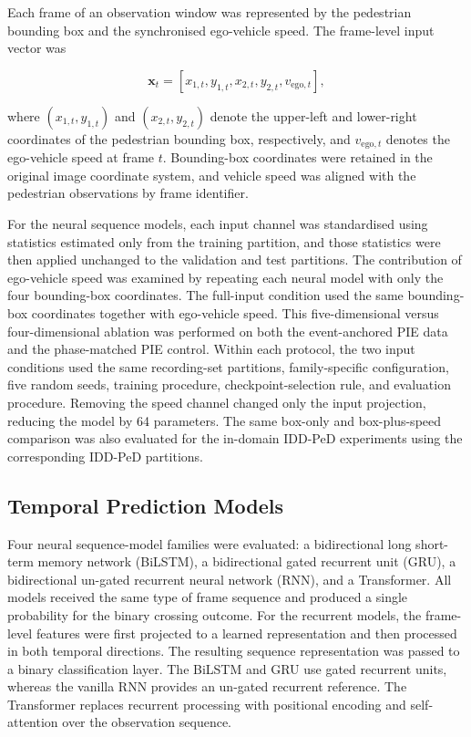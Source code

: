 \documentclass[mti,article,submit,moreauthors]{Definitions/mdpi}
\begin{document}
Each frame of an observation window was represented by the pedestrian bounding box and
the synchronised ego-vehicle speed. The frame-level input vector was

\begin{equation}
    \mathbf{x}_{t}
    =
    \left[
    x_{1,t},
    y_{1,t},
    x_{2,t},
    y_{2,t},
    v_{\mathrm{ego},t}
    \right],
\end{equation}

where $(x_{1,t},y_{1,t})$ and $(x_{2,t},y_{2,t})$ denote the upper-left and lower-right
coordinates of the pedestrian bounding box, respectively, and $v_{\mathrm{ego},t}$ denotes the ego-vehicle speed at frame $t$. Bounding-box coordinates were retained in the original image coordinate system, and vehicle speed was aligned with the pedestrian observations by frame identifier.

For the neural sequence models, each input channel was standardised using statistics estimated only from the training partition, and those statistics were then applied unchanged to the validation and test partitions. The contribution of ego-vehicle speed was examined by repeating each neural model with only the four bounding-box coordinates. The full-input condition used the same bounding-box coordinates together with ego-vehicle speed. This five-dimensional versus four-dimensional ablation was performed on both the event-anchored PIE data and the phase-matched PIE control. Within each protocol, the two input conditions used the same recording-set
partitions, family-specific configuration, five random seeds, training procedure, checkpoint-selection rule, and evaluation procedure. Removing the speed channel changed only the input projection, reducing the model by 64 parameters. The same box-only and box-plus-speed comparison was also evaluated for the in-domain IDD-PeD experiments using the corresponding IDD-PeD partitions.


\subsection{Temporal Prediction Models}

Four neural sequence-model families were evaluated: a bidirectional long short-term memory network (BiLSTM), a bidirectional gated recurrent unit (GRU), a bidirectional un-gated recurrent neural network (RNN), and a Transformer. All models received the same type of frame sequence and produced a single probability for the binary crossing outcome. For the recurrent models, the frame-level features were first projected to a learned representation and then processed in both temporal directions. The resulting sequence representation was passed to a binary classification layer. The BiLSTM and GRU use gated recurrent units, whereas the vanilla RNN provides an un-gated recurrent reference. The Transformer replaces recurrent processing with positional encoding and self-attention over the observation sequence.
\end{document}
